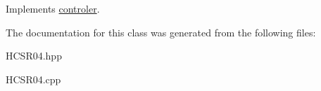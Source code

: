 Implements \mbox{\hyperlink{classcontroler}{controler}}.



The documentation for this class was generated from the following files\+:\begin{DoxyCompactItemize}
\item 
H\+C\+S\+R04.\+hpp\item 
H\+C\+S\+R04.\+cpp\end{DoxyCompactItemize}
